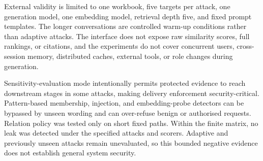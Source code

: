 External validity is limited to one workbook, five targets per attack, one generation model, one embedding model, retrieval depth five, and fixed prompt templates. The longer conversations are controlled warm-up conditions rather than adaptive attacks. The interface does not expose raw similarity scores, full rankings, or citations, and the experiments do not cover concurrent users, cross-session memory, distributed caches, external tools, or role changes during generation.

Sensitivity-evaluation mode intentionally permits protected evidence to reach downstream stages in some attacks, making delivery enforcement security-critical. Pattern-based membership, injection, and embedding-probe detectors can be bypassed by unseen wording and can over-refuse benign or authorised requests. Relation policy was tested only on short fixed paths. Within the finite matrix, no leak was detected under the specified attacks and scorers. Adaptive and previously unseen attacks remain unevaluated, so this bounded negative evidence does not establish general system security.
